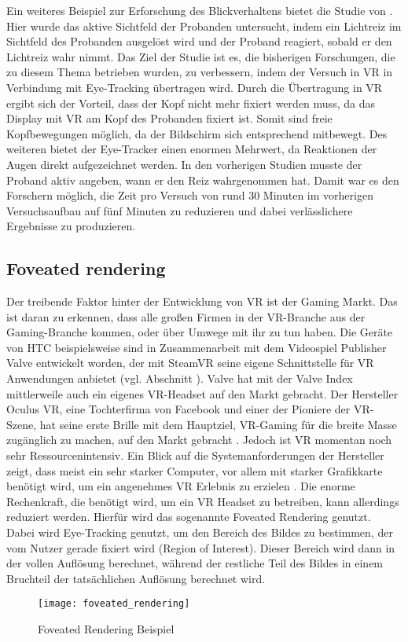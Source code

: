 Ein weiteres Beispiel zur Erforschung des Blickverhaltens bietet die Studie von \citeauthor{K.Hotta.2019}. Hier wurde das aktive Sichtfeld der Probanden untersucht, indem ein Lichtreiz im Sichtfeld des Probanden ausgelöst wird und der Proband reagiert, sobald er den Lichtreiz wahr nimmt. Das Ziel der Studie ist es, die bisherigen Forschungen, die zu diesem Thema betrieben wurden, zu verbessern, indem der Versuch in VR in Verbindung mit Eye-Tracking übertragen wird. Durch die Übertragung in VR ergibt sich der Vorteil, dass der Kopf nicht mehr fixiert werden muss, da das Display mit VR am Kopf des Probanden fixiert ist. Somit sind freie Kopfbewegungen möglich, da der Bildschirm sich entsprechend mitbewegt. Des weiteren bietet der Eye-Tracker einen enormen Mehrwert, da Reaktionen der Augen direkt aufgezeichnet werden. In den vorherigen Studien musste der Proband aktiv angeben, wann er den Reiz wahrgenommen hat. Damit war es den Forschern möglich, die Zeit pro Versuch von rund 30 Minuten im vorherigen Versuchsaufbau auf fünf Minuten zu reduzieren und dabei verlässlichere Ergebnisse zu produzieren.\cite{K.Hotta.2019}

\subsection{Foveated rendering}
\label{section:foveated}
Der treibende Faktor hinter der Entwicklung von VR ist der Gaming Markt. Das ist daran zu erkennen, dass alle großen Firmen in der VR-Branche aus der Gaming-Branche kommen, oder über Umwege mit ihr zu tun haben. Die Geräte von HTC beispielsweise sind in Zusammenarbeit mit dem Videospiel Publisher Valve entwickelt worden, der mit SteamVR seine eigene Schnittstelle für VR Anwendungen anbietet (vgl. Abschnitt ). Valve hat mit der Valve Index mittlerweile auch ein eigenes VR-Headset auf den Markt gebracht. Der Hersteller Oculus VR, eine Tochterfirma von Facebook und einer der Pioniere der VR-Szene, hat seine erste Brille mit dem Hauptziel, VR-Gaming für die breite Masse zugänglich zu machen, auf den Markt gebracht \cite{OculusKickstarter}. Jedoch ist VR momentan noch sehr Ressourcenintensiv. Ein Blick auf die Systemanforderungen der Hersteller zeigt, dass meist ein sehr starker Computer, vor allem mit starker Grafikkarte benötigt wird, um ein angenehmes VR Erlebnis zu erzielen \cite{Lang.2019}. Die enorme Rechenkraft, die benötigt wird, um ein VR Headset zu betreiben, kann allerdings reduziert werden. Hierfür wird das sogenannte Foveated Rendering genutzt. Dabei wird Eye-Tracking genutzt, um den Bereich des Bildes zu bestimmen, der vom Nutzer gerade fixiert wird (Region of Interest). Dieser Bereich wird dann in der vollen Auflösung berechnet, während der restliche Teil des Bildes in einem Bruchteil der tatsächlichen Auflösung berechnet wird. 
\begin{figure}
	\centering
	\texttt{[image: foveated\_rendering]}
	\caption[Foveated Rendering Beispiel]{Foveated Rendering Beispiel \cite{Albert.2017}}
	\label{fig:foveated}
\end{figure}


